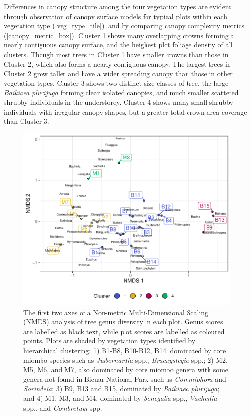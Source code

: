 \documentclass[11pt,a4paper]{article}
\begin{document}
Differences in canopy structure among the four vegetation types are evident through observation of canopy surface models for typical plots within each vegetation type (\autoref{veg_type_tile}), and by comparing canopy complexity metrics (\autoref{canopy_metric_box}). Cluster 1 shows many overlapping crowns forming a nearly contiguous canopy surface, and the heighest plot foliage density of all clusters. Though most trees in Cluster 1 have smaller crowns than those in Cluster 2, which also forms a nearly contiguous canopy. The largest trees in Cluster 2 grow taller and have a wider spreading canopy than those in other vegetation types. Cluster 3 shows two distinct size classes of tree, the large \textit{Baikiaea plurijuga} forming clear isolated canopies, and much smaller scattered shrubby individuals in the understorey. Cluster 4 shows many small shrubby individuals with irregular canopy shapes, but a greater total crown area coverage than Cluster 3. 

\begin{figure}
	\includegraphics[width=\linewidth]{nmds}
	\caption[NMDS of plots based on genera basal area abundance]{The first two axes of a Non-metric Multi-Dimensional Scaling (NMDS) analysis of tree genus diversity in each plot. Genus scores are labelled as black text, while plot scores are labelled as coloured points. Plots are shaded by vegetation types identified by hierarchical clustering: 1) B1-B8, B10-B12, B14, dominated by core miombo species such as \textit{Julbernardia} spp., \textit{Brachystegia} spp.; 2) M2, M5, M6, and M7, also dominated by core miombo genera with some genera not found in Bicuar National Park such as \textit{Commiphora} and \textit{Sorindeia}; 3) B9, B13 and B15, dominated by \textit{Baikiaea plurijuga}; and 4) M1, M3, and M4, dominated by \textit{Senegalia} spp., \textit{Vachellia} spp., and \textit{Combretum} spp.}
	\label{nmds}
\end{figure}
\end{document}

